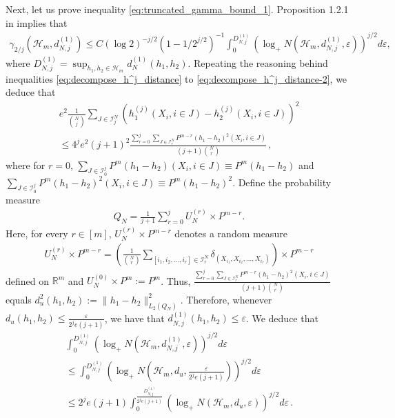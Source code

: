 \documentclass[12pt]{article}
\def\l{\left}
\def\r{\right}
\newcommand{\mb}{\mathbb}
\theoremstyle{thmstyletwo}%
\theoremstyle{thmstylethree}%
\begin{document}
Next, let us prove inequality \eqref{eq:truncated_gamma_bound_1}. Proposition 1.2.1 in \citep{talagrand2005generic} implies that
\begin{align*}
    \gamma_{2/j} (\mathcal{H}_m, d^{(1)}_{N,j})\leq C(\log 2)^{-j/2}(1- 1/2^{j/2})^{-1} \int_0^{D_{N,j}^{(1)}} \l(\log_+ N(\mathcal{H}_m, d^{(1)}_{N,j}, \varepsilon) \r)^{j/2} d\varepsilon,
\end{align*}
where $D_{N,j}^{(1)} = \sup_{h_1, h_2 \in \mathcal{H}_m} d_N^{(1)}(h_1, h_2)$. Repeating the reasoning behind inequalities \eqref{eq:decompose_h^j_distance} to \eqref{eq:decompose_h^j_distance-2}, we deduce that
\begin{multline*}
    e^2\frac{1}{{N \choose j}}\sum_{J \in \mathcal{I}^N_j} \l(h^{(j)}_1 \l(X_i, i \in J\r) - h^{(j)}_2 \l(X_i, i \in J\r)\r)^2 \\
    \leq 4^{j}e^2(j+1)^2 \frac{\sum_{r=0}^j \sum_{J \in \mathcal{I}^N_r} P^{m-r}(h_1 - h_2)^2(X_i, i \in J) }{(j+1){N \choose r}}\,,
\end{multline*}
where for $r=0$,
\(\sum_{J \in \mathcal{I}^j_0} P^m (h_1 - h_2)(X_i, i \in J) \equiv P^m(h_1 - h_2) \) and \(\sum_{J \in \mathcal{I}^j_0} P^m (h_1 - h_2)^2(X_i, i \in J) \equiv P^m(h_1 - h_2)^2 \). Define the probability measure 
\begin{align}\label{eq:u_N}
    Q_N = \frac{1}{j+1} \sum_{r=0} ^ j U^{(r)}_N \times P^{m-r}.
\end{align}
Here, for every $r \in [m]$, $U^{(r)}_N \times P^{m-r}$ denotes a random measure
\begin{align*}
    U^{(r)}_N \times P^{m-r} = \l(\frac{1}{{N \choose r}}\sum_{[i_1, i_2, \ldots, i_r] \in \mathcal{I}_r^N }\delta_{(X_{i_1}, X_{i_2}, \ldots, X_{i_r})} \r) \times P^{m-r}
\end{align*}
defined on $\mb R^m$ and $U^{(0)}_N \times P^m := P^m$. Thus, $\frac{\sum_{r=0}^j \sum_{J \in \mathcal{I}^N_r} P^{m-r}(h_1 - h_2)^2(X_i, i \in J) }{(j+1){N \choose r}}$ equals $d^2_u (h_1, h_2) := \|h_1 - h_2\|^2_{L_2(Q_N)}$. Therefore, whenever $d_u(h_1, h_2) \leq \frac{\varepsilon}{2^{j}e(j+1)}$, we have that $d^{(1)}_{N,j}(h_1, h_2) \leq \varepsilon$. We deduce that
\begin{multline*}
    \int_0^{D_{N,j}^{(1)}} \l(\log_+ N(\mathcal{H}_m, d^{(1)}_{N,j}, \varepsilon) \r)^{j/2} d\varepsilon \\
    \leq \int_0^{D_{N,j}^{(1)}} \l(\log_+ N\l(\mathcal{H}_m, d_u, \frac{\varepsilon}{2^je(j+1)}\r) \r)^{j/2} d\varepsilon \\
    \leq 2^j e(j+1) \int_0^{\frac{D_{N,j}^{(1)}}{2^je(j+1)}} \l(\log_+ N\l(\mathcal{H}_m, d_u, \varepsilon\r) \r)^{j/2} d\varepsilon \,.
\end{multline*}
\end{document}
